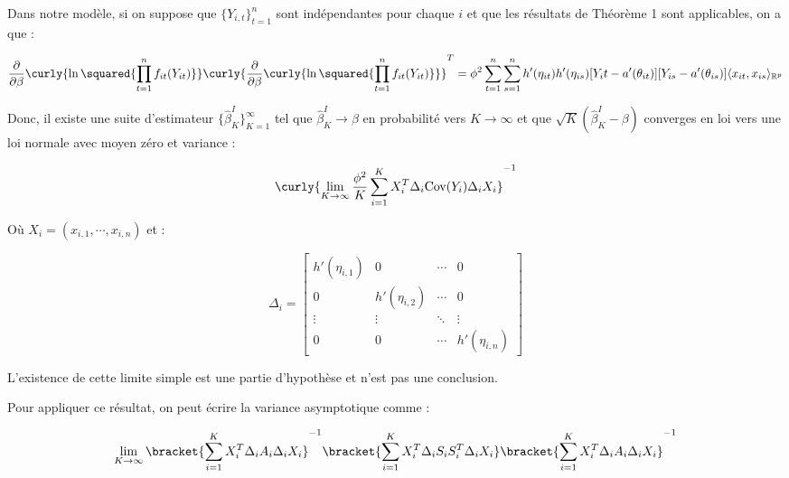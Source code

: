 \documentclass[../main.tex]{subfiles}
\begin{document}
\begin{theorem}
Dans notre modèle, si on suppose que $\{Y_{i,t}\}_{t=1}^n$ sont indépendantes pour chaque $i$
et que les résultats de Théorème 1 sont applicables,
on a que :

\begin{equation*}
    \frac{\partial}{\partial \beta} \curly{\ln \squared{\prod_{t=1}^n f_{it}(Y_{it})}} 
    \curly{\frac{\partial}{\partial \beta} \curly{\ln \squared{\prod_{t=1}^n f_{it}(Y_{it})}}}^T = 
    \phi^2 \sum_{t=1}^n \sum_{s=1}^n h'(\eta_{it})h'(\eta_{is}) [Y_it - a'(\theta_{it})][Y_{is}-a'(\theta_{is})] \langle x_{it}, x_{is} \rangle_{\mathbb{R}^p}
\end{equation*}

Donc, il existe une suite d'estimateur $\{\hat{\beta}_K^I\}_{K=1}^{\infty}$
tel que $\hat{\beta}_K^I \to \beta$ en probabilité vers $K \to \infty$ et
que $\sqrt{K}(\hat{\beta}_K^I - \beta)$ converges en loi vers une loi normale avec moyen zéro et
variance : 

\begin{equation*}
    \curly{ \lim_{K \to \infty} \frac{\phi^2}{K} \sum_{i=1}^K X_i^T \Delta_i \text{Cov}(Y_i) \Delta_i X_i }^{-1}
\end{equation*}

Où $X_i = (x_{i,1}, \cdots, x_{i,n})$ et :

\begin{equation*}
    \Delta_i =
    \begin{bmatrix}
        h'(\eta_{i,1}) & 0 & \cdots & 0 \\
        0 & h'(\eta_{i,2}) & \cdots & 0 \\
        \vdots & \vdots & \ddots & \vdots \\
        0 & 0 & \cdots & h'(\eta_{i,n})
    \end{bmatrix}
\end{equation*}

L'existence de cette limite simple est une partie d'hypothèse et n'est pas une conclusion.
\end{theorem}

Pour appliquer ce résultat, on peut écrire la variance asymptotique comme :

\begin{equation*}
    \lim_{K \to \infty} \bracket{\sum_{i=1}^KX_i^T \Delta_i A_i \Delta_i X_i }^{-1} 
    \bracket{\sum_{i=1}^KX_i^T \Delta_i S_i S_i^T \Delta_i X_i }
    \bracket{\sum_{i=1}^KX_i^T \Delta_i A_i \Delta_i X_i }^{-1} 
\end{equation*}
\end{document}
